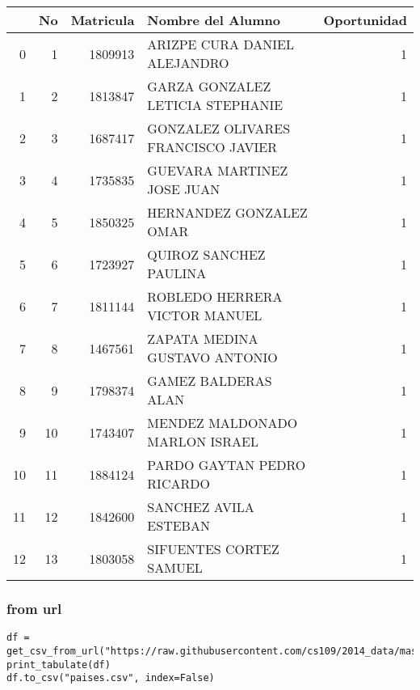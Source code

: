 \documentclass[11pt]{article}
\begin{document}
\begin{center}
\begin{tabular}{rrrlr}
 & No & Matricula & Nombre del Alumno & Oportunidad\\
\hline
0 & 1 & 1809913 & ARIZPE CURA DANIEL ALEJANDRO & 1\\
1 & 2 & 1813847 & GARZA GONZALEZ LETICIA STEPHANIE & 1\\
2 & 3 & 1687417 & GONZALEZ OLIVARES FRANCISCO JAVIER & 1\\
3 & 4 & 1735835 & GUEVARA MARTINEZ JOSE JUAN & 1\\
4 & 5 & 1850325 & HERNANDEZ GONZALEZ OMAR & 1\\
5 & 6 & 1723927 & QUIROZ SANCHEZ PAULINA & 1\\
6 & 7 & 1811144 & ROBLEDO HERRERA VICTOR MANUEL & 1\\
7 & 8 & 1467561 & ZAPATA MEDINA GUSTAVO ANTONIO & 1\\
8 & 9 & 1798374 & GAMEZ BALDERAS ALAN & 1\\
9 & 10 & 1743407 & MENDEZ MALDONADO MARLON ISRAEL & 1\\
10 & 11 & 1884124 & PARDO GAYTAN PEDRO RICARDO & 1\\
11 & 12 & 1842600 & SANCHEZ AVILA ESTEBAN & 1\\
12 & 13 & 1803058 & SIFUENTES CORTEZ SAMUEL & 1\\
\end{tabular}
\end{center}

\subsubsection{from url}
\label{sec:orgec89fe3}
\begin{verbatim}
df = get_csv_from_url("https://raw.githubusercontent.com/cs109/2014_data/master/countries.csv")
print_tabulate(df)
df.to_csv("paises.csv", index=False)
\end{verbatim}
\end{document}
